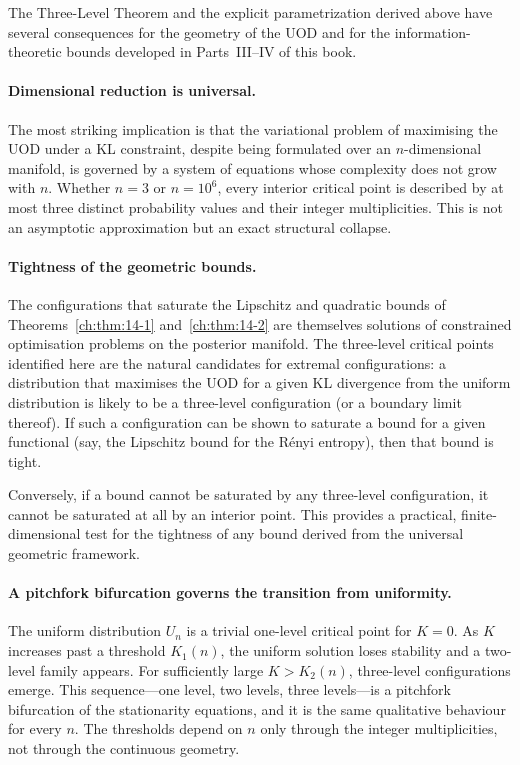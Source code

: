 The Three-Level Theorem and the explicit parametrization derived above
have several consequences for the geometry of the UOD and for the
information-theoretic bounds developed in Parts~III--IV of this book.

\paragraph{Dimensional reduction is universal.}
The most striking implication is that the variational problem of
maximising the UOD under a KL constraint, despite being formulated over
an \(n\)-dimensional manifold, is governed by a system of equations
whose complexity does not grow with \(n\).  Whether \(n=3\) or
\(n=10^6\), every interior critical point is described by at most three
distinct probability values and their integer multiplicities.  This is
not an asymptotic approximation but an exact structural collapse.

\paragraph{Tightness of the geometric bounds.}
The configurations that saturate the Lipschitz and quadratic bounds of
Theorems~\ref{ch:thm:14-1} and~\ref{ch:thm:14-2} are themselves
solutions of constrained optimisation problems on the posterior
manifold.  The three-level critical points identified here are the
natural candidates for extremal configurations: a distribution that
maximises the UOD for a given KL divergence from the uniform
distribution is likely to be a three-level configuration (or a
boundary limit thereof).  If such a configuration can be shown to
saturate a bound for a given functional (say, the Lipschitz bound for
the R\'enyi entropy), then that bound is tight.

Conversely, if a bound cannot be saturated by any three-level
configuration, it cannot be saturated at all by an interior point.
This provides a practical, finite-dimensional test for the tightness of
any bound derived from the universal geometric framework.

\paragraph{A pitchfork bifurcation governs the transition from
uniformity.}
The uniform distribution \(U_n\) is a trivial one-level critical point
for \(K=0\).  As \(K\) increases past a threshold \(K_1(n)\), the
uniform solution loses stability and a two-level family appears.
For sufficiently large \(K>K_2(n)\), three-level configurations emerge.
This sequence---one level, two levels, three levels---is a
pitchfork bifurcation of the stationarity equations, and it is the same
qualitative behaviour for every \(n\).  The thresholds depend on \(n\)
only through the integer multiplicities, not through the continuous
geometry.

